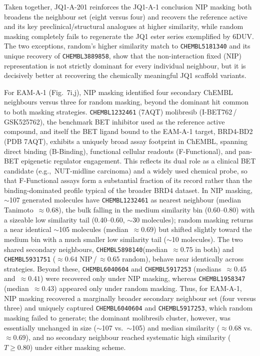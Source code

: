 \documentclass[a4paper,12pt]{article}
\begin{document}
Taken together, JQ1-A-201 reinforces the JQ1-A-1 conclusion NIP masking both broadens the neighbour set (eight versus four) and recovers the reference active and its key preclinical/structural analogues at higher similarity, while random masking completely fails to regenerate the JQ1 ester series exemplified by 6DUV. The two exceptions, random's higher similarity match to \texttt{CHEMBL5181340} and its unique recovery of \texttt{CHEMBL3889858}, show that the non-interaction fixed (NIP) representation is not strictly dominant for every individual neighbour, but it is decisively better at recovering the chemically meaningful JQ1 scaffold variants.

For EAM-A-1 (Fig.~7i,j), NIP masking identified four secondary ChEMBL neighbours
versus three for random masking, beyond the dominant hit common to both masking
strategies. \texttt{CHEMBL1232461} (7AQT) molibresib (I-BET762\,/\, GSK525762), the
benchmark BET inhibitor used as the reference active compound, and itself the BET
ligand bound to the EAM-A-1 target, BRD4-BD2 (PDB 7AQT), exhibits a uniquely
broad assay footprint in ChEMBL, spanning direct binding (B-Binding), functional
cellular readouts (F-Functional), and pan-BET epigenetic regulator engagement.
This reflects its dual role as a clinical BET candidate (e.g.,~NUT-midline
carcinoma) and a widely used chemical probe, so that F-Functional assays form a substantial fraction of its record rather than the binding-dominated profile
typical of the broader BRD4 dataset. In NIP masking, $\sim$107 generated molecules
have \texttt{CHEMBL1232461} as nearest neighbour (median Tanimoto~$\approx 0.68$), the bulk
falling in the medium similarity bin (0.60--0.80) with a sizeable low similarity
tail (0.40--0.60, $\sim$30 molecules); random masking returns a near identical
$\sim$105 molecules (median~$\approx 0.69$) but shifted slightly toward the medium
bin with a much smaller low similarity tail ($\sim$10 molecules). The two shared
secondary neighbours, \texttt{CHEMBL5898140}(median~$\approx 0.75$ in both) and
\texttt{CHEMBL5931751} ($\approx 0.64$ NIP\,/\,$\approx 0.65$ random), behave
near identically across strategies. Beyond these, \texttt{CHEMBL6040604} and \texttt{CHEMBL5917253}
(medians~$\approx 0.45$ and~$\approx 0.41$) were recovered only under NIP masking,
whereas \texttt{CHEMBL1958347} (median~$\approx 0.43$) appeared only under random masking.
Thus, for EAM-A-1, NIP masking recovered a marginally broader secondary neighbour
set (four versus three) and uniquely captured \texttt{CHEMBL6040604} and \texttt{CHEMBL5917253},
which random masking failed to generate; the dominant molibresib cluster, however,
was essentially unchanged in size ($\sim$107 vs.\ $\sim$105) and median similarity
($\approx 0.68$ vs.\ $\approx 0.69$), and no secondary neighbour reached systematic
high similarity ($T \geq 0.80$) under either masking scheme.
\end{document}
